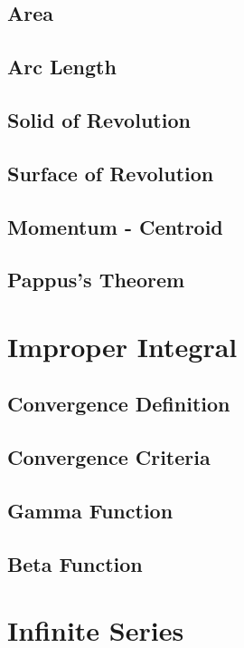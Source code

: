 \documentclass[a4paper,12pt]{article}
\begin{document}
\subsection{Area}
\label{sec:orgcd264fa}
\subsection{Arc Length}
\label{sec:orgdf88967}
\subsection{Solid of Revolution}
\label{sec:org8a1435e}
\subsection{Surface of Revolution}
\label{sec:orgca1affc}
\subsection{Momentum - Centroid}
\label{sec:org273d8ac}
\subsection{Pappus's Theorem}
\label{sec:orgbf63804}

\newpage

\section{Improper Integral}
\label{sec:orgbe8be4e}
\subsection{Convergence Definition}
\label{sec:orgfa6b806}
\subsection{Convergence Criteria}
\label{sec:org0562ea5}
\subsection{Gamma Function}
\label{sec:orge3cb25c}
\subsection{Beta Function}
\label{sec:org27a750f}
\section{Infinite Series}
\label{sec:orgf3b64dd}
\end{document}
